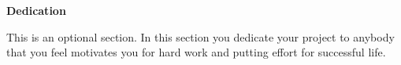 
\clearpage


\vspace*{-0.15cm} 
{\centering
    {\fontsize{16pt}{20pt}\selectfont \textbf{Dedication} \par}
}
\vspace{0.5cm}

\noindent
This is an optional section. In this section you dedicate your project to anybody that you feel motivates you for hard work and putting effort for successful life.
